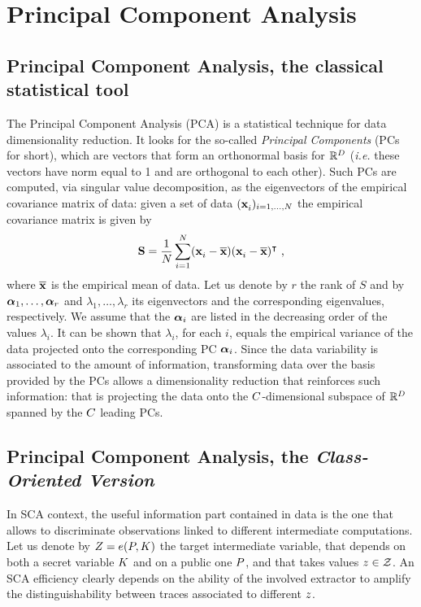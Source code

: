 \section{Principal Component Analysis}\label{sec:PCA}
%
%
\subsection{Principal Component Analysis, the classical statistical tool}
The Principal Component Analysis (PCA) \cite{fisher1938statistical} is a statistical technique for data dimensionality reduction. It looks for the so-called {\em Principal Components} (PCs for short), which are vectors that form an orthonormal basis for $\mathbb{R}^\traceLength$ (\textit{i.e.} these vectors have norm equal to 1 and are orthogonal to each other). Such PCs are computed, via singular value decomposition, as the eigenvectors of the empirical covariance matrix of data: given a set of data $(\sss[]{i})_{i=1,\dots,\numTraces[]}$ the empirical covariance matrix is given by
\begin{equation}\label{eq:covmat}
\covmat = \frac{1}{\numTraces[]} \sum_{i=1}^{\numTraces[]}(\sss[]{i} - \mmmX)(\sss[]{i} - \mmmX)^\intercal \mbox{ ,}
\end{equation}
 where $\mmmX$ is the empirical mean of data. Let us denote by $r$ the rank of $S$ and by $\AAlpha_1, \dots, \AAlpha_r$ and $\lambda_1, \dots, \lambda_r$ its eigenvectors and the corresponding eigenvalues, respectively. We assume that the $\AAlpha_i$ are listed in the decreasing order of the values $\lambda_i$. It can be shown that $\lambda_i$, for each $i$, equals the empirical variance of the data projected onto the corresponding PC $\AAlpha_i$. Since the data variability is associated to the amount of information, transforming data over the basis provided by the PCs allows a dimensionality reduction that reinforces such information: that is projecting the data onto the  $\newTraceLength$-dimensional subspace of $\mathbb{R}^\traceLength$ spanned by the $\newTraceLength$ leading PCs.\\

\subsection{Principal Component Analysis, the {\em Class-Oriented Version}}\label{sec:PCA_classes}
In SCA context, the useful information part contained in data is the one that allows to discriminate observations linked to different intermediate computations. Let us denote by $\sensRandVar = \targetFunction(\randPlaintext,\randKey)$ the target intermediate variable, that depends on both a secret variable $\randKey$ and on a public one $\randPlaintext$, and that takes values $\sensVar \in \sensVarSet$. An SCA efficiency clearly depends on the ability of the involved extractor to amplify the distinguishability between traces associated to different $\sensVar$.\\


